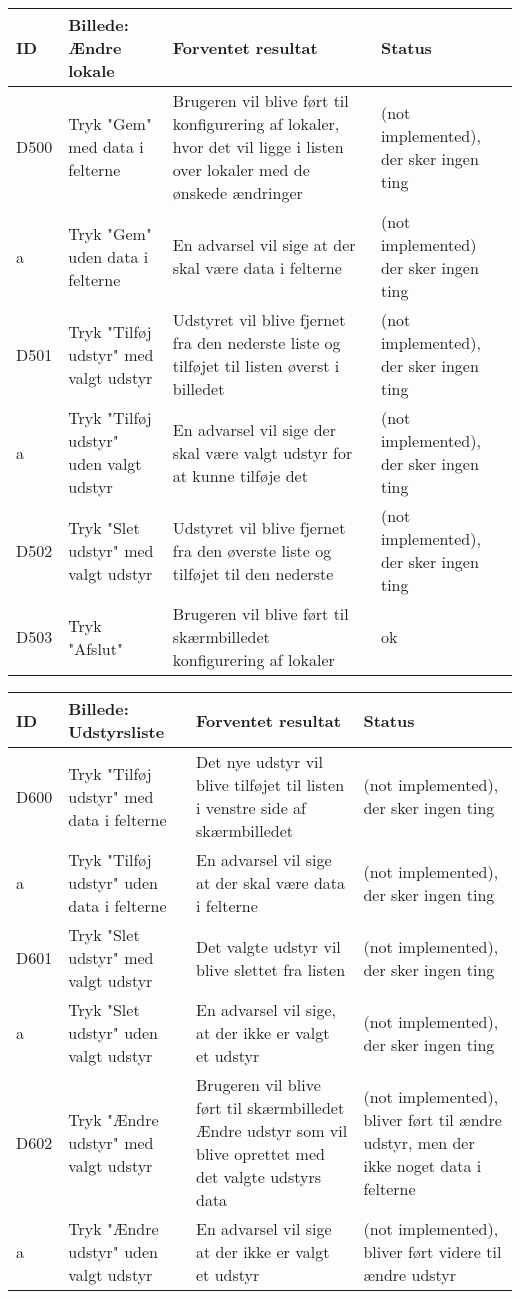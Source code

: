 \begin{tabularx}{\textwidth}{ |X|X|X|X| }
\hline
	ID & Billede: Ændre lokale  & Forventet resultat & Status\\ 
\hline
	D500 & Tryk "Gem" med data i felterne & Brugeren vil blive ført til konfigurering af lokaler, hvor det vil ligge i listen over lokaler med de ønskede ændringer  & (not implemented), der sker ingen ting\\
\hline
	a & Tryk "Gem" uden data i felterne & En advarsel vil sige at der skal være data i felterne &(not implemented) der sker ingen ting \\
\hline
	D501 & Tryk "Tilføj udstyr" med valgt udstyr & Udstyret vil blive fjernet fra den nederste liste og tilføjet til listen øverst i billedet &(not implemented), der sker ingen ting \\
\hline
	a & Tryk "Tilføj udstyr" uden valgt udstyr & En advarsel vil sige der skal være valgt udstyr for at kunne tilføje det &(not implemented), der sker ingen ting \\
\hline
	D502 & Tryk "Slet udstyr" med valgt udstyr & Udstyret vil blive fjernet fra den øverste liste og tilføjet til den nederste  &(not implemented), der sker ingen ting \\
\hline
	D503 & Tryk "Afslut" & Brugeren vil blive ført til skærmbilledet konfigurering af lokaler & ok\\
\hline
\end{tabularx}

\begin{tabularx}{\textwidth}{ |X|X|X|X| }
\hline
	ID & Billede: Udstyrsliste  & Forventet resultat & Status\\ 
\hline
	D600 & Tryk "Tilføj udstyr" med data i felterne & Det nye udstyr vil blive tilføjet til listen i venstre side af skærmbilledet &(not implemented), der sker ingen ting \\
\hline
	a & Tryk "Tilføj udstyr" uden data i felterne & En advarsel vil sige at der skal være data i felterne &(not implemented), der sker ingen ting \\
\hline
	D601 & Tryk "Slet udstyr" med valgt udstyr & Det valgte udstyr vil blive slettet fra listen &(not implemented), der sker ingen ting \\
\hline
	a & Tryk "Slet udstyr" uden valgt udstyr & En advarsel vil sige, at der ikke er valgt et udstyr &(not implemented), der sker ingen ting \\
\hline
	D602 & Tryk "Ændre udstyr" med valgt udstyr & Brugeren vil blive ført til skærmbilledet Ændre udstyr som vil blive oprettet med det valgte udstyrs data &(not implemented), bliver ført til ændre udstyr, men der ikke noget data i felterne \\
\hline
	a & Tryk "Ændre udstyr" uden valgt udstyr & En advarsel vil sige at der ikke er valgt et udstyr & (not implemented), bliver ført videre til ændre udstyr \\
\hline
\end{tabularx}


